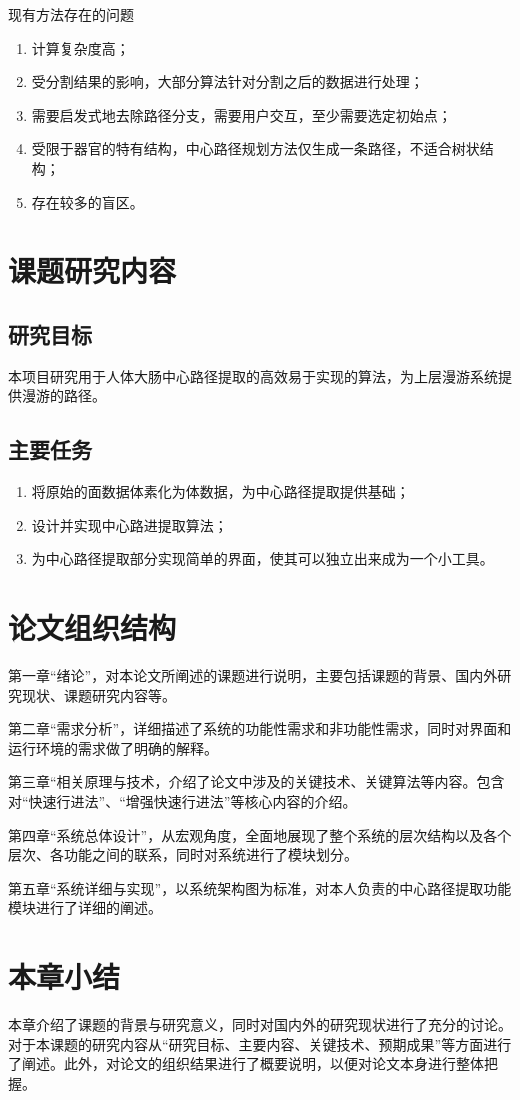 现有方法存在的问题

\begin{enumerate}
    \item 计算复杂度高；
　　\item 受分割结果的影响，大部分算法针对分割之后的数据进行处理；
　　\item 需要启发式地去除路径分支，需要用户交互，至少需要选定初始点；
　　\item 受限于器官的特有结构，中心路径规划方法仅生成一条路径，不适合树状结构；
　　\item 存在较多的盲区。
\end{enumerate}

\section{课题研究内容}
\subsection{研究目标}
本项目研究用于人体大肠中心路径提取的高效易于实现的算法，为上层漫游系统提供漫游的路径。

\subsection{主要任务}

\begin{enumerate}
    \item 将原始的面数据体素化为体数据，为中心路径提取提供基础；
    \item 设计并实现中心路进提取算法；
    \item 为中心路径提取部分实现简单的界面，使其可以独立出来成为一个小工具。
\end{enumerate}

\section{论文组织结构}
第一章“绪论”，对本论文所阐述的课题进行说明，主要包括课题的背景、国内外研究现状、课题研究内容等。

第二章“需求分析”，详细描述了系统的功能性需求和非功能性需求，同时对界面和运行环境的需求做了明确的解释。

第三章“相关原理与技术，介绍了论文中涉及的关键技术、关键算法等内容。包含对“快速行进法”、“增强快速行进法”等核心内容的介绍。

第四章“系统总体设计”，从宏观角度，全面地展现了整个系统的层次结构以及各个层次、各功能之间的联系，同时对系统进行了模块划分。

第五章“系统详细与实现”，以系统架构图为标准，对本人负责的中心路径提取功能模块进行了详细的阐述。

\section{本章小结}
本章介绍了课题的背景与研究意义，同时对国内外的研究现状进行了充分的讨论。对于本课题的研究内容从“研究目标、主要内容、关键技术、预期成果”等方面进行了阐述。此外，对论文的组织结果进行了概要说明，以便对论文本身进行整体把握。
